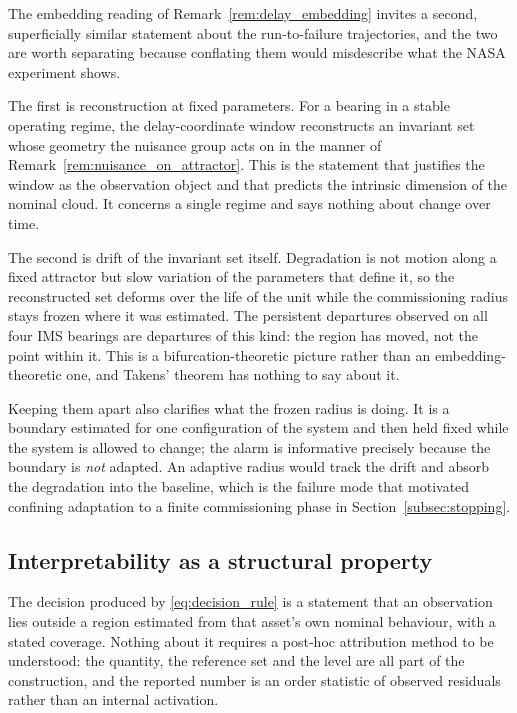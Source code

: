 \documentclass[a4paper]{cas-sc}
\begin{document}
The embedding reading of Remark~\ref{rem:delay_embedding} invites a second,
superficially similar statement about the run-to-failure trajectories, and the
two are worth separating because conflating them would misdescribe what the
NASA experiment shows.

The first is reconstruction at fixed parameters. For a bearing in a stable
operating regime, the delay-coordinate window reconstructs an invariant set
whose geometry the nuisance group acts on in the manner of
Remark~\ref{rem:nuisance_on_attractor}. This is the statement that justifies
the window as the observation object and that predicts the intrinsic dimension
of the nominal cloud. It concerns a single regime and says nothing about
change over time.

The second is drift of the invariant set itself. Degradation is not motion
along a fixed attractor but slow variation of the parameters that define it,
so the reconstructed set deforms over the life of the unit while the
commissioning radius stays frozen where it was estimated. The persistent
departures observed on all four IMS bearings are departures of this kind: the
region has moved, not the point within it. This is a bifurcation-theoretic
picture rather than an embedding-theoretic one, and Takens' theorem has
nothing to say about it.

Keeping them apart also clarifies what the frozen radius is doing. It is a
boundary estimated for one configuration of the system and then held fixed
while the system is allowed to change; the alarm is informative precisely
because the boundary is \emph{not} adapted. An adaptive radius would track the
drift and absorb the degradation into the baseline, which is the failure mode
that motivated confining adaptation to a finite commissioning phase in
Section~\ref{subsec:stopping}.

\subsection{Interpretability as a structural property}
\label{subsec:disc_interpretability}

The decision produced by \eqref{eq:decision_rule} is a statement that an
observation lies outside a region estimated from that asset's own nominal
behaviour, with a stated coverage. Nothing about it requires a post-hoc
attribution method to be understood: the quantity, the reference set and the
level are all part of the construction, and the reported number is an order
statistic of observed residuals rather than an internal activation.
\end{document}
